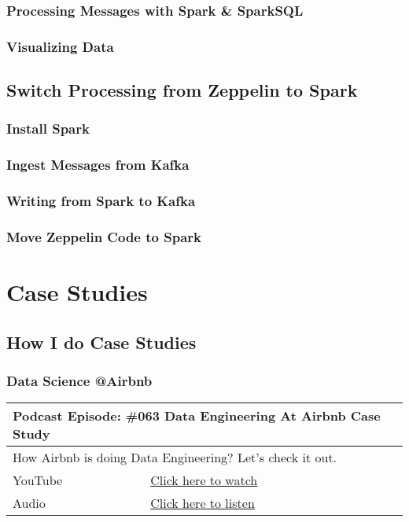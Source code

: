 \documentclass[12pt, numbers=noenddot]{scrreprt} %
\begin{document}
\section{Processing Messages with Spark \& SparkSQL}

\section{Visualizing Data}


\chapter{Switch Processing from Zeppelin to Spark}

\section{Install Spark}

\section{Ingest Messages from Kafka}

\section{Writing from Spark to Kafka}

\section{Move Zeppelin Code to Spark}




\part{Case Studies}

\chapter{How I do Case Studies}

\section{Data Science @Airbnb}

\begin{table}[h]
\begin{tabular}{ll}
\hline
\multicolumn{2}{l}{\textbf{Podcast Episode:} \#063 Data Engineering At Airbnb Case Study} \\ \hline
\multicolumn{2}{p{15cm}}{How Airbnb is doing Data Engineering? Let's check it out.}         \\ \hline
\multicolumn{1}{l|}{YouTube}   & \href{https://youtu.be/iokqkMfyIfo}{Click here to watch}   \\ 
\multicolumn{1}{l|}{Audio}     & \href{https://anchor.fm/andreaskayy/episodes/063-Data-Engineering-At-Airbnb-Case-Study-e45il2}{Click here to listen}   \\ \hline
\end{tabular}
\end{table}
\end{document}
